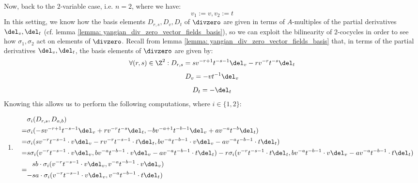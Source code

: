\begin{example}
            Now, back to the $2$-variable case, i.e. $n = 2$, where we have:
                $$v_1 := v, v_2 := t$$
            In this setting, we know how the basis elements $D_{r, s}, D_v, D_t$ of $\divzero$ are given in terms of $A$-multiples of the partial derivatives $\del_v, \del_t$ (cf. lemma \ref{lemma: yangian_div_zero_vector_fields_basis}), so we can exploit the bilinearity of $2$-cocycles in order to see how $\sigma_1, \sigma_2$ act on elements of $\divzero$. Recall from lemma \ref{lemma: yangian_div_zero_vector_fields_basis} that, in terms of the partial derivatives $\del_v, \del_t$, the basis elements of $\divzero$ are given by:
                $$\forall (r, s) \in \Z^2: D_{r, s} = s v^{-r + 1} t^{-s - 1} \del_v - r v^{-r} t^{-s} \del_t$$
                $$D_v = -v t^{-1} \del_v$$
                $$D_t = -\del_t$$
            Knowing this allows us to perform the following computations, where $i \in \{1, 2\}$:
            \begin{enumerate}
                \item 
                    $$
                        \begin{aligned}
                            & \sigma_i(D_{r, s}, D_{a, b})
                            \\
                            = & \sigma_i( -s v^{-r + 1} t^{-s - 1} \del_v + r v^{-r} t^{-s} \del_t, -b v^{-a + 1} t^{-b - 1} \del_v + a v^{-a} t^{-b} \del_t )
                            \\
                            = & \sigma_i( s v^{-r} t^{-s - 1} \cdot v\del_v - r v^{-r} t^{-s - 1} \cdot t \del_t, b v^{-a} t^{-b - 1} \cdot v\del_v - a v^{-a} t^{-b - 1} \cdot t \del_t )
                            \\
                            = & s \sigma_i( v^{-r} t^{-s - 1} \cdot v\del_v, b v^{-a} t^{-b - 1} \cdot v\del_v - a v^{-a} t^{-b - 1} \cdot t \del_t ) - r \sigma_i( v^{-r} t^{-s - 1} \cdot t \del_t, b v^{-a} t^{-b - 1} \cdot v\del_v - a v^{-a} t^{-b - 1} \cdot t \del_t )
                            \\
                            = &
                            \begin{aligned}
                                & s b \cdot \sigma_i( v^{-r} t^{-s - 1} \cdot v\del_v, v^{-a} t^{-b - 1} \cdot v\del_v )
                                \\
                                - & s a \cdot \sigma_i( v^{-r} t^{-s - 1} \cdot v\del_v, v^{-a} t^{-b - 1} \cdot t \del_t )
                                \\

\end{aligned}
\end{aligned}$$
\end{enumerate}
\end{example}
